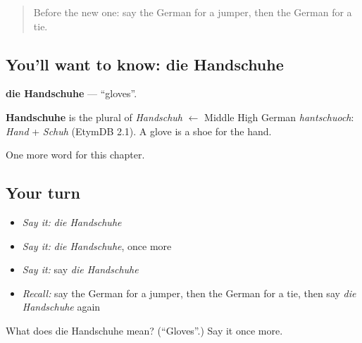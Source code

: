 \begin{quote}
Before the new one: say the German for a jumper, then the German for a tie.
\end{quote}

\subsection*{You'll want to know: die Handschuhe}
\textbf{die Handschuhe} — \textquotedblleft{}gloves\textquotedblright{}.

\begin{cousinweb}
\textbf{Handschuhe} is the plural of \emph{Handschuh} $\leftarrow$ Middle High German \emph{hantschuoch}: \emph{Hand} + \emph{Schuh} (EtymDB 2.1). A glove is a shoe for the hand.
\end{cousinweb}

\begin{grammarlens}[title={What you've built}]
One more word for this chapter.
\end{grammarlens}

\subsection*{Your turn}
\begin{itemize}
\raggedright
  \item \emph{Say it:} \emph{die Handschuhe}
  \item \emph{Say it:} \emph{die Handschuhe}, once more
  \item \emph{Say it:} say \emph{die Handschuhe}
  \item \emph{Recall:} say the German for a jumper, then the German for a tie, then say \emph{die Handschuhe} again
\end{itemize}

\begin{tcolorbox}[breakable,colback=teal!4,colframe=teal!35!black,title={Before you move on}]
What does die Handschuhe mean? (\textquotedblleft{}Gloves\textquotedblright{}.) Say it once more.
\end{tcolorbox}

